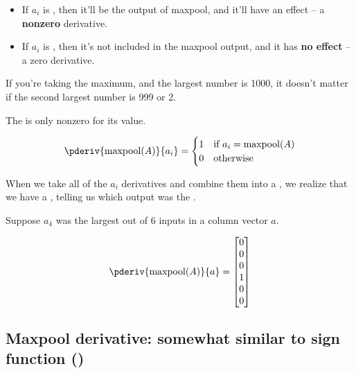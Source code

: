         \begin{itemize}
            \item If $a_i$ is , then it'll be the output of maxpool, and it'll have an effect -- a \textbf{nonzero} derivative.
            \item If $a_i$ is , then it's not included in the maxpool output, and it has \textbf{no effect} -- a zero derivative.
        \end{itemize}

        \miniex If you're taking the maximum, and the largest number is 1000, it doesn't matter if the second largest number is 999 or 2.\\

        \begin{kequation}
            The  is only nonzero for its  value.

            \begin{equation*}
                \pderiv{\operatorname{maxpool}(A)}{a_i} =
                \begin{cases}
                    1 & \text{if }a_i= \operatorname{maxpool}(A) \\
                    0 & \text{otherwise}
                \end{cases}
            \end{equation*}
        \end{kequation}

        When we take all of the $a_i$ derivatives and combine them into a , we realize that we have a , telling us which output was the .

        \miniex Suppose $a_4$ was the largest out of 6 inputs in a column vector $a$.

        \begin{equation}
            \pderiv{\operatorname{maxpool}(A)}{a} = 
            \begin{bmatrix}
                0 \\ 0 \\ 0 \\ 1 \\ 0 \\ 0
            \end{bmatrix}
        \end{equation}

    \subsection{Maxpool derivative: somewhat similar to sign function ()}

